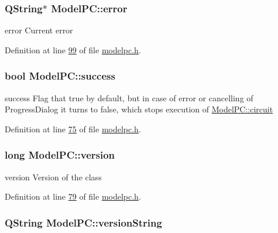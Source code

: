 \hypertarget{class_model_p_c_a4e5a9c0ca1f06fe5bc478b6bf248c37c}{
\subsubsection[{error}]{\setlength{\rightskip}{0pt plus 5cm}Q\-String$\ast$ Model\-P\-C\-::error}}\label{class_model_p_c_a4e5a9c0ca1f06fe5bc478b6bf248c37c}


error Current error 



Definition at line \hyperlink{modelpc_8h_source_l00099}{99} of file \hyperlink{modelpc_8h_source}{modelpc.\-h}.

\hypertarget{class_model_p_c_a945ffbbc44a832b953c191debd448f4c}{
\subsubsection[{success}]{\setlength{\rightskip}{0pt plus 5cm}bool Model\-P\-C\-::success}}\label{class_model_p_c_a945ffbbc44a832b953c191debd448f4c}


success Flag that true by default, but in case of error or cancelling of Progress\-Dialog it turns to false, which stops execution of \hyperlink{class_model_p_c_a1d0091062a0c836b283ec2f67411623b}{Model\-P\-C\-::circuit} 



Definition at line \hyperlink{modelpc_8h_source_l00075}{75} of file \hyperlink{modelpc_8h_source}{modelpc.\-h}.

\hypertarget{class_model_p_c_a5af48ab89e19be42a94c34ba00249401}{
\subsubsection[{version}]{\setlength{\rightskip}{0pt plus 5cm}long Model\-P\-C\-::version}}\label{class_model_p_c_a5af48ab89e19be42a94c34ba00249401}


version Version of the class 



Definition at line \hyperlink{modelpc_8h_source_l00079}{79} of file \hyperlink{modelpc_8h_source}{modelpc.\-h}.

\hypertarget{class_model_p_c_a5f426725ccf7eefd3c77ea8c720264c9}{
\subsubsection[{version\-String}]{\setlength{\rightskip}{0pt plus 5cm}Q\-String Model\-P\-C\-::version\-String}}\label{class_model_p_c_a5f426725ccf7eefd3c77ea8c720264c9}


